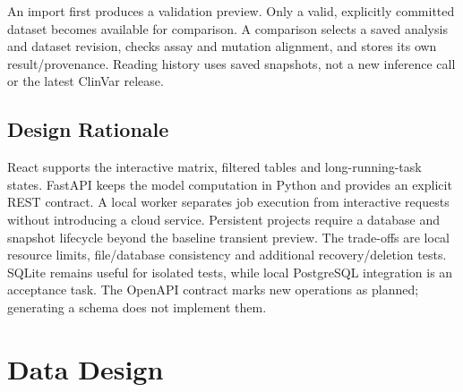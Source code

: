 An import first produces a validation preview. Only a valid, explicitly committed dataset becomes
available for comparison. A comparison selects a saved analysis and dataset revision, checks assay
and mutation alignment, and stores its own result/provenance. Reading history uses saved snapshots,
not a new inference call or the latest ClinVar release.

\subsection{Design Rationale}
React supports the interactive matrix, filtered tables and long-running-task states. FastAPI keeps the
model computation in Python and provides an explicit REST contract. A local worker separates job
execution from interactive requests without introducing a cloud service. Persistent projects require
a database and snapshot lifecycle beyond the baseline transient preview. The trade-offs are local
resource limits, file/database consistency and additional recovery/deletion tests. SQLite remains
useful for isolated tests, while local PostgreSQL integration is an acceptance task. The OpenAPI
contract marks new operations as planned; generating a schema does not implement them.

\section{Data Design}
